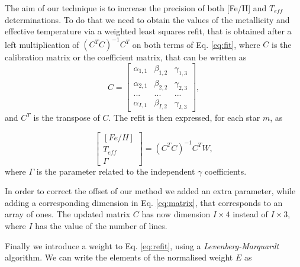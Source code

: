 \documentclass{aa}
\newcommand\T{\rule{0pt}{2.6ex}}
\begin{document}
The aim of our technique is to increase the precision of both [Fe/H] and $T_{eff}$ determinations. To do that we need to obtain the values of the metallicity and effective temperature via a weighted least squares refit, that is obtained after a left multiplication of $(C^{T}C)^{-1}C^{T}$ on both terms of Eq. \ref{eq:fit}, where $C$ is the calibration matrix or the coefficient matrix, that can be written as
\begin{equation}
\label{eq:matrix}
C = \left[\begin{array}{ccc} \alpha_{1,1} & \beta_{1,2} & \gamma_{1,3} \\ \alpha_{2,1} & \beta_{2,2} & \gamma_{2,3} \\... & ... & ...\\ \alpha_{I,1} & \beta_{I,2} & \gamma_{I,3} \end{array}\right],
\end{equation}
and $C^{T}$ is the transpose of $C$. The refit is then expressed, for each star $m$, as

\begin{equation}
\label{eq:refit}
\left[\begin{array}{c} [Fe/H] \\T_{eff} \\ \Gamma \end{array}\right] =  (C^{T}C)^{-1}C^{T}W,
\end{equation}
where $\Gamma$ is the parameter related to the independent  $\gamma$ coefficients.

In order to correct the offset of our method we added an extra parameter, while adding a corresponding dimension in Eq. \ref{eq:matrix}, that corresponds to an array of ones. The updated matrix $C$ has now dimension $I \times 4$ instead of $I \times 3$, where $I$ has the value of the number of lines.



Finally we introduce a weight to Eq. \ref{eq:refit}, using a \textit{Levenberg-Marquardt} \citep[][]{Press-1992} algorithm. We can write the elements of the normalised weight $E$ as
\end{document}
